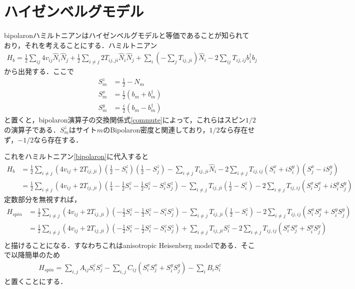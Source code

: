 \documentclass[a4j]{jarticle}
\begin{document}
\section{ハイゼンベルグモデル}
bipolaronハミルトニアンはハイゼンベルグモデルと等価であることが知られており，それを考えることにする．ハミルトニアン
\begin{align}
 H_b=\frac{1}{2}\sum_{ij}4v_{ij}\hat{N}_{i}\hat{N}_{j}+\frac{1}{2}\sum_{i\neq j}2T_{ij,ji}\hat{N}_{i}\hat{N}_{j}+\sum_{i}\left(-\sum_{j}T_{ij,ji}\right)\hat{N}_{i}-2\sum_{ij}T_{ij,ij}b^{\dagger}_ib_j 
\end{align}
から出発する．ここで
\begin{align*}
 S^z_m&=\frac{1}{2}-N_m \\
 S^x_m&=\frac{1}{2}\left(b_m+b^{\dagger}_m\right)\\
 S^y_m&=\frac{i}{2}\left(b_m-b^{\dagger}_m\right)
\end{align*}
と置くと，bipolaron演算子の交換関係式\eqref{commute}によって，これらはスピン$1/2$の演算子である．$S^z_m$はサイト$m$のBipolaron密度と関連しており，$1/2$なら存在せず，$-1/2$なら存在する．

これをハミルトニアン\eqref{bipolaron}に代入すると
\begin{align*}
 H_b&=\frac{1}{2}\sum_{i\neq j}\left(4v_{ij}+2T_{ij,ji}\right)\left(\frac{1}{2}-S^z_i\right)\left(\frac{1}{2}-S^z_j\right)
 -\sum_{i\neq j}T_{ij,ji}\hat{N}_{i} - 2\sum_{i\neq j}T_{ij,ij}\left(S^x_i+iS^y_i\right)\left(S^x_j-iS^y_j\right)  \\
 &=\frac{1}{2}\sum_{i\neq j}\left(4v_{ij}+2T_{ij,ji}\right)\left(\frac{1}{4}-\frac{1}{2}S^z_i-\frac{1}{2}S^z_i-S^z_iS^z_j\right)
 -\sum_{i\neq j}T_{ij,ji}\left(\frac{1}{2}-S^z_i\right) - 2\sum_{i\neq j}T_{ij,ij}\left(S^x_iS^x_j+iS^y_iS^y_j\right)
\end{align*}
定数部分を無視すれば，
\begin{align*}
 H_{spin} &=\frac{1}{2}\sum_{i\neq j}\left(4v_{ij}+2T_{ij,ji}\right)\left(-\frac{1}{2}S^z_i-\frac{1}{2}S^z_i-S^z_iS^z_j\right)
 -\sum_{i\neq j}T_{ij,ji}\left(\frac{1}{2}-S^z_i\right) - 2\sum_{i\neq j}T_{ij,ij}\left(S^x_iS^x_j+S^y_iS^y_j\right)\label{heisen} \\
 &=\frac{1}{2}\sum_{i\neq j}\left(4v_{ij}+2T_{ij,ji}\right)\left(-\frac{1}{2}S^z_i-\frac{1}{2}S^z_i-S^z_iS^z_j\right)
 +\sum_{i\neq j}T_{ij,ji}S^z_i - 2\sum_{i\neq j}T_{ij,ij}\left(S^x_iS^x_j+S^y_iS^y_j\right)\\
\end{align*}
と描けることになる．すなわちこれはanisotropic Heisenberg modelである．そこで以降簡単のため
\begin{align*}
 H_{spin}=\sum_{i,j}A_{ij}S^z_iS^z_j-\sum_{i,j}C_{ij}\left(S^x_iS^x_j+S^y_iS^y_j\right)-\sum_iB_iS^z_i
\end{align*}
と置くことにする．
\end{document}
